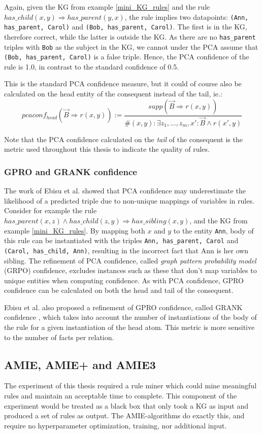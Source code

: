 Again, given the KG from example \ref{mini_KG_rules} and the rule $has\_child(x, y) \Rightarrow has\_parent(y, x)$, the rule implies two datapoints: \texttt{(Ann, has\_parent, Carol)} and \texttt{(Bob, has\_parent, Carol)}. The first is in the KG, therefore correct, while the latter is outside the KG. As there are no \texttt{has\_parent} triples with \texttt{Bob} as the subject in the KG, we cannot under the PCA assume that \texttt{(Bob, has\_parent, Carol)} is a false triple. Hence, the PCA confidence of the rule is 1.0, in contrast to the standard confidence of 0.5.

This is the standard PCA confidence measure, but it could of course also be calculated on the head entity of the consequent instead of the tail, ie.: 
\[pcaconf_{head}(\vec{B}\Rightarrow r(x, y)) := \frac{supp(\vec{B}\Rightarrow r(x, y))}{\#(x, y):\exists z_1 ,..., z_m, x' : \vec{B} \wedge r(x', y)}\]

Note that the PCA confidence calculated on the \textit{tail} of the consequent is the metric used throughout this thesis to indicate the quality of rules.

\subsubsection{GPRO and GRANK confidence}
The work of Ebisu et al. \cite{gpro} showed that PCA confidence may underestimate the likelihood of a predicted triple due to non-unique mappings of variables in rules. Consider for example the rule $has\_parent(x, z) \wedge has\_child(z, y) \Rightarrow has\_sibling(x, y)$, and the KG from example \ref{mini_KG_rules}. By mapping both $x$ and $y$ to the entity \texttt{Ann}, body of this rule can be instantiated with the triples \texttt{Ann, has\_parent, Carol} and \texttt{(Carol, has\_child, Ann)}, resulting in the incorrect fact that Ann is her own sibling. The refinement of PCA confidence, called \textit{graph pattern probability model} (GRPO) confidence, excludes instances such as these that don't map variables to unique entities when computing confidence. As with PCA confidence, GPRO confidence can be calculated on both the head and tail of the consequent.

Ebisu et al. also proposed a refinement of GPRO confidence, called GRANK confidence \cite{gpro}, which takes into account the number of instantiations of the body of the rule for a given instantiation of the head atom. This metric is more sensitive to the number of facts per relation.


\subsection{AMIE, AMIE+ and AMIE3}
\label{the_amies}
The experiment of this thesis required a rule miner which could mine meaningful rules and maintain an acceptable time to complete. This component of the experiment would be treated as a black box that only took a KG as input and produced a set of rules as output. The AMIE-algorithms do exactly this, and require no hyperparameter optimization, training, nor additional input.

